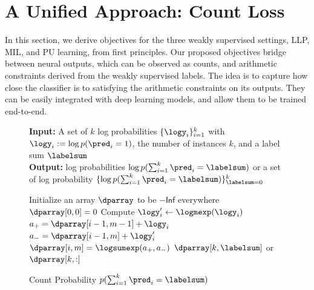 \documentclass{article}
\begin{document}
\section{A Unified Approach: Count Loss }
\label{sec: A Unified Approach}
In this section, we derive objectives for the three weakly supervised settings, LLP, MIL, and PU learning, from first principles. 
Our proposed objectives bridge between neural outputs, which can be observed as counts, and arithmetic constraints derived from the weakly supervised labels.
The idea is to capture how close the classifier is to satisfying the arithmetic constraints on its outputs.
They can be easily integrated with 
deep learning models, and allow them to be trained end-to-end.
\begin{figure}
\begin{center}
\begin{minipage}[t]{1.0\textwidth}
\begin{algorithm}[H]
    \caption{Count Probability $p(\sum_{i = 1}^k \pred_i = \labelsum)$}
    \label{alg:cap}
    \textbf{Input: } 
    A set of $k$ log probabilities $\{ \logy_i \}_{i=1}^k$ with $\logy_i := \log p(\pred_i = 1)$, the number of instances $k$, and a label sum $\labelsum$ \\
    \textbf{Output: } log probabilities $\log p(\sum_{i = 1}^k \pred_i = \labelsum)$
    or a set of log probability $\{\log p(\sum_{i = 1}^k \pred_i = \labelsum)\}_{\labelsum=0}^k$
    \begin{algorithmic}
        \State \hspace{-1em}
        \State Initialize an array $\dparray$ to be $-\mathsf{Inf}$ everywhere
        \State $\dparray[0, 0] = 0$ 
        \State Compute $\logy_i^\prime \gets \logmexp(\logy_i)$
        \hspace{-1em}
            \State $a_+ = \dparray[i - 1, m - 1] + \logy_i$
            \State $a_- = \dparray[i - 1, m] + \logy_i^\prime$
            \State $\dparray[i, m] = \logsumexp(a_+, a_-)$
        \EndFor
        \EndFor
        \Return $\dparray[k, \labelsum]$ or $\dparray[k, :]$
    \end{algorithmic}
\end{algorithm}
\end{minipage}
\end{center}
\end{figure}
\end{document}
